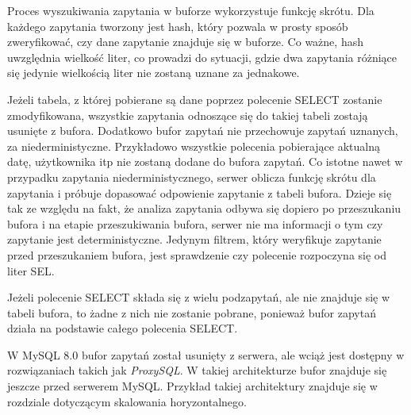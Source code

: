 Proces wyszukiwania zapytania w buforze wykorzystuje funkcję skrótu. Dla każdego zapytania tworzony jest hash, który pozwala w prosty sposób zweryfikować, czy dane zapytanie znajduje się w buforze. Co ważne, hash uwzględnia wielkość liter, co prowadzi do sytuacji, gdzie dwa zapytania różniące się jedynie wielkością liter nie zostaną uznane za jednakowe.

Jeżeli tabela, z której pobierane są dane poprzez polecenie SELECT  zostanie zmodyfikowana, wszystkie zapytania odnoszące się do takiej tabeli zostają usunięte z bufora. Dodatkowo bufor zapytań nie przechowuje zapytań uznanych, za niederministyczne. Przykładowo wszystkie polecenia pobierające aktualną datę, użytkownika itp nie zostaną dodane do bufora zapytań. Co istotne nawet w przypadku zapytania niederministycznego, serwer oblicza funkcję skrótu dla zapytania i próbuje dopasować odpowienie zapytanie z tabeli bufora. Dzieje się tak ze względu na fakt, że analiza zapytania odbywa się dopiero po przeszukaniu bufora i na etapie przeszukiwania bufora, serwer nie ma informacji o tym czy zapytanie jest deterministyczne. Jedynym filtrem, który weryfikuje zapytanie przed przeszukaniem bufora, jest sprawdzenie czy polecenie rozpoczyna się od liter SEL.

Jeżeli polecenie SELECT składa się z wielu podzapytań, ale nie znajduje się w tabeli bufora, to żadne z nich nie zostanie pobrane, ponieważ bufor zapytań działa na podstawie całego polecenia SELECT.

W MySQL 8.0 bufor zapytań został usunięty z serwera, ale wciąż jest dostępny w rozwiązaniach takich jak \textit{ProxySQL}. W takiej architekturze bufor znajduje się jeszcze przed serwerem MySQL. Przykład takiej architektury znajduje się w rozdziale dotyczącym skalowania horyzontalnego.

